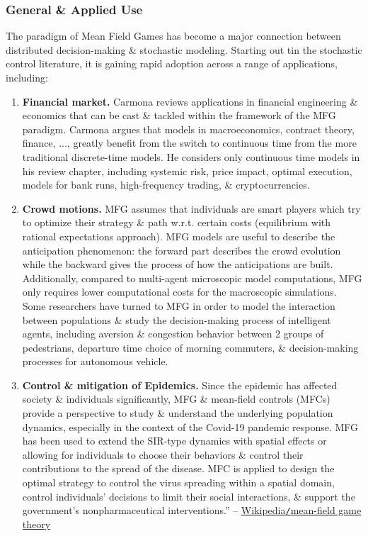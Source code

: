 \documentclass{article}
\begin{document}
\subsubsection{General \& Applied Use}
The paradigm of Mean Field Games has become a major connection between distributed decision-making \& stochastic modeling. Starting out tin the stochastic control literature, it is gaining rapid adoption across a range of applications, including:
\begin{enumerate}
	\item {\bf Financial market.} Carmona reviews applications in financial engineering \& economics that can be cast \& tackled within the framework of the MFG paradigm. Carmona argues that models in macroeconomics, contract theory, finance, $\ldots$, greatly benefit from the switch to continuous time from the more traditional discrete-time models. He considers only continuous time models in his review chapter, including systemic risk, price impact, optimal execution, models for bank runs, high-frequency trading, \& cryptocurrencies.
	\item {\bf Crowd motions.} MFG assumes that individuals are smart players which try to optimize their strategy \& path w.r.t. certain costs (equilibrium with rational expectations approach). MFG models are useful to describe the anticipation phenomenon: the forward part describes the crowd evolution while the backward gives the process of how the anticipations are built. Additionally, compared to multi-agent microscopic model computations, MFG only requires lower computational costs for the macroscopic simulations. Some researchers have turned to MFG in order to model the interaction between populations \& study the decision-making process of intelligent agents, including aversion \& congestion behavior between 2 groups of pedestrians, departure time choice of morning commuters, \& decision-making processes for autonomous vehicle.
	\item {\bf Control \& mitigation of Epidemics.} Since the epidemic has affected society \& individuals significantly, MFG \& mean-field controls (MFCs) provide a perspective to study \& understand the underlying population dynamics, especially in the context of the Covid-19 pandemic response. MFG has been used to extend the SIR-type dynamics with spatial effects or allowing for individuals to choose their behaviors \& control their contributions to the spread of the disease. MFC is applied to design the optimal strategy to control the virus spreading within a spatial domain, control individuals' decisions to limit their social interactions, \& support the government's nonpharmaceutical interventions.'' -- \href{https://en.wikipedia.org/wiki/Mean-field_game_theory}{Wikipedia{\tt/}mean-field game theory}
\end{enumerate}
\end{document}
